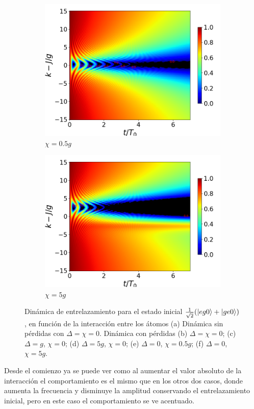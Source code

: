 \begin{figure}[h!]
    \vfill
    \begin{subfigure}{0.49\textwidth}
        \includegraphics[width=\textwidth]{figuras/ch4/concu/k/eg0+ge0 d=0.0g x=0.5g J=15.0g gamma=0.25g concu k dis.png}
        \caption{$\chi=0.5g$}
        \label{fig4:concu k x1}
    \end{subfigure}
    \hfill
    \begin{subfigure}{0.49\textwidth}
        \includegraphics[width=\textwidth]{figuras/ch4/concu/k/eg0+ge0 d=0.0g x=5.0g J=15.0g gamma=0.25g concu k dis.png}
        \caption{$\chi=5g$}
        \label{fig4:concu k x2}
    \end{subfigure}
    \caption{Dinámica de entrelazamiento para el estado inicial $\frac{1}{\sqrt{2}}(\ket{eg0}+\ket{ge0})$, en función de la interacción entre los átomos (a) Dinámica sin pérdidas con $\Delta=\chi=0$.  Dinámica con pérdidas (b) $\Delta=\chi=0$; (c) $\Delta=g$, $\chi=0$; (d) $\Delta=5g$, $\chi=0$; (e) $\Delta=0$, $\chi=0.5g$; (f) $\Delta=0$, $\chi=5g$.}
    \label{fig4:concu k 0}
\end{figure}
Desde el comienzo ya se puede ver como al aumentar el valor absoluto de la interacción el comportamiento es el mismo que en los otros dos casos, donde aumenta la frecuencia y disminuye la amplitud conservando el entrelazamiento inicial, pero en este caso el  comportamiento se ve acentuado. 


